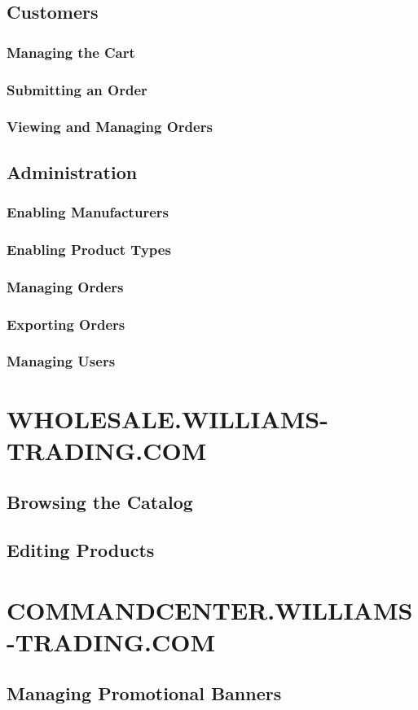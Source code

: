 \subsection{Customers}

\subsubsection{Managing the Cart}

\subsubsection{Submitting an Order}

\subsubsection{Viewing and Managing Orders}

\subsection{Administration}

\subsubsection{Enabling Manufacturers}

\subsubsection{Enabling Product Types}

\subsubsection{Managing Orders}

\subsubsection{Exporting Orders}

\subsubsection{Managing Users}

\section{WHOLESALE.WILLIAMS-TRADING.COM}

\subsection{Browsing the Catalog}

\subsection{Editing Products}

\section{COMMANDCENTER.WILLIAMS-TRADING.COM}

\subsection{Managing Promotional Banners}